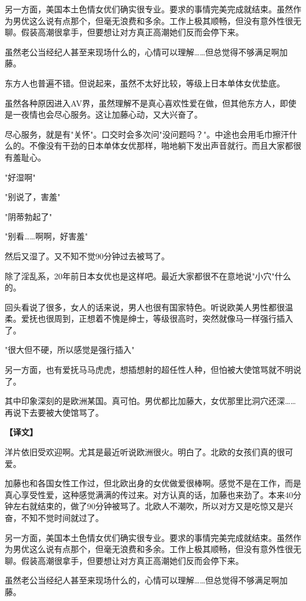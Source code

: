 \documentclass[12pt,UTF8]{ctexbook}
\begin{document}
{{另一方面，美国本土色情女优们确实很专业。要求的事情完美完成就结束。虽然作为男优这么说有点那个，但毫无浪费和多余。工作上极其顺畅，但没有意外性很无聊。假装高潮很拿手，但要想让对方真正高潮她们反而会停下来。

虽然老公当经纪人甚至来现场什么的，心情可以理解……但总觉得不够满足啊加藤。

东方人也普遍不错。但说起来，虽然不太好比较，等级上日本单体女优垫底。

虽然各种原因进入AV界，虽然理解不是真心喜欢性爱在做，但其他东方人，即使是一夜情也会尽心服务。这让加藤心动，又大兴奋了。

尽心服务，就是有"关怀"。口交时会多次问"没问题吗？"。中途也会用毛巾擦汗什么的。不像没有干劲的日本单体女优那样，啪地躺下发出声音就行。而且大家都很有羞耻心。

"好湿啊"

"别说了，害羞"

"阴蒂勃起了"

"别看……啊啊，好害羞"

然后又湿了。又不知不觉90分钟过去被骂了。

除了淫乱系，20年前日本女优也是这样吧。最近大家都很不在意地说"小穴"什么的。

回头看说了很多，女人的话来说，男人也很有国家特色。听说欧美人男性都很温柔。爱抚也很周到，正想着不愧是绅士，等级很高时，突然就像马一样强行插入了。

"很大但不硬，所以感觉是强行插入"

另一方面，也有爱抚马马虎虎，想插想射的超任性人种，但怕被大使馆骂就不明说了。

其中印象深刻的是欧洲某国。真可怕。男优都比加藤大，女优那里比洞穴还深……再说下去要被大使馆骂了。
}

\vspace{2ex}
\parbox{0.9\linewidth}{
\textbf{【译文】}\par

洋片依旧受欢迎啊。尤其是最近听说欧洲很火。明白了。北欧的女孩们真的很可爱。

加藤也和各国女性工作过，但北欧出身的女优做爱很棒啊。感觉不是在工作，而是真心享受性爱，这种感觉满满的传过来。对方认真的话，加藤也来劲了。本来40分钟左右就结束的，做了90分钟被骂了。北欧人不潮吹，所以对方又是吃惊又是兴奋，不知不觉时间就过了。

另一方面，美国本土色情女优们确实很专业。要求的事情完美完成就结束。虽然作为男优这么说有点那个，但毫无浪费和多余。工作上极其顺畅，但没有意外性很无聊。假装高潮很拿手，但要想让对方真正高潮她们反而会停下来。

虽然老公当经纪人甚至来现场什么的，心情可以理解……但总觉得不够满足啊加藤。

}}
\end{document}

